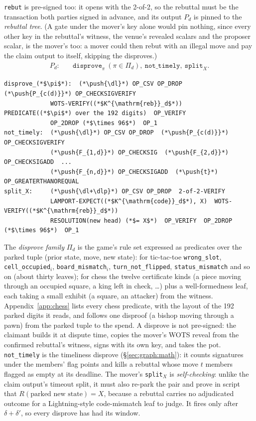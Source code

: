 \documentclass[11pt]{article}
\newcommand{\push}[1]{\ensuremath{\langle #1\rangle}}
\newcommand{\dl}{\delta}
\newcommand{\dlp}{\delta'}
\begin{document}
\texttt{rebut} is pre-signed too: it opens with the 2-of-2, so the
rebuttal must be the transaction both parties signed in advance, and
its output $P_d$ is pinned to the \emph{rebuttal tree}. (A gate under the
mover's key alone would pin nothing, since every other key in the
rebuttal's witness, the venue's revealed scalars and the proposer
scalar, is the mover's too: a mover could then rebut with an illegal
move and pay the claim output to itself, skipping the disproves.)
\begin{align*}
  P_d:\quad & \texttt{disprove}_\pi\ (\pi \in \Pi_d),\ \texttt{not\_timely},\
  \texttt{split}_X.
\end{align*}
\begin{lstlisting}[style=script]
disprove_(*$\pi$*):  (*\push{\dl}*) OP_CSV OP_DROP  (*\push{P_{c(d)}}*) OP_CHECKSIGVERIFY
             WOTS-VERIFY((*$K^{\mathrm{reb}}_d$*))  PREDICATE((*$\pi$*) over the 192 digits)  OP_VERIFY
             OP_2DROP (*$\times 96$*)  OP_1
not_timely:  (*\push{\dl}*) OP_CSV OP_DROP  (*\push{P_{c(d)}}*) OP_CHECKSIGVERIFY
             (*\push{F_{1,d}}*) OP_CHECKSIG  (*\push{F_{2,d}}*) OP_CHECKSIGADD  ...
             (*\push{F_{n,d}}*) OP_CHECKSIGADD  (*\push{t}*) OP_GREATERTHANOREQUAL
split_X:     (*\push{\dl+\dlp}*) OP_CSV OP_DROP  2-of-2-VERIFY
             LAMPORT-EXPECT((*$K^{\mathrm{code}}_d$*), X)  WOTS-VERIFY((*$K^{\mathrm{reb}}_d$*))
             RESOLUTION(new head) (*$= X$*)  OP_VERIFY  OP_2DROP (*$\times 96$*)  OP_1
\end{lstlisting}
The \emph{disprove family} $\Pi_d$ is the game's rule set expressed as
predicates over the parked tuple (prior state, move, new state): for
tic-tac-toe \texttt{wrong\_slot}, \texttt{cell\_occupied}$_i$,
\texttt{board\_mismatch}$_i$, \texttt{turn\_not\_flipped},
\texttt{status\_mismatch} and so on (about thirty leaves); for chess the
twelve certificate kinds (a piece moving through an occupied square, a
king left in check, \dots) plus a well-formedness leaf, each taking a
small exhibit (a square, an attacker) from the witness.
Appendix~\ref{app:chess} lists every chess predicate, with the layout
of the 192 parked digits it reads, and follows one disproof (a bishop
moving through a pawn) from the parked tuple to the spend. A disprove is
not pre-signed: the claimant builds it at dispute time, copies the
mover's WOTS reveal from the confirmed rebuttal's witness, signs with
its own key, and takes the pot. \texttt{not\_timely} is the timeliness
disprove (\S\ref{sec:graph:math}): it counts signatures under the
members' flag points and kills a rebuttal whose move $t$ members
flagged as empty at its deadline. The mover's \texttt{split}$_X$ is
\emph{self-checking}: unlike the claim output's timeout split, it must
also re-park the pair and prove in script that $R(\text{parked new
state}) = X$, because a rebuttal carries no adjudicated outcome for
a Lightning-style code-mismatch leaf to judge. It fires only after
$\dl + \dlp$, so every disprove has had its window.
\end{document}
